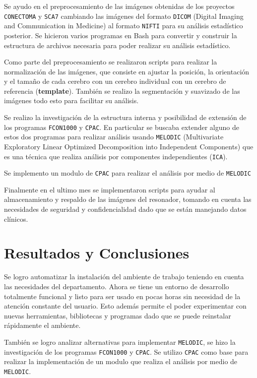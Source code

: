 \documentclass{article}
\begin{document}
Se ayudo en el preprocesamiento de las imágenes obtenidas de los proyectos \texttt{CONECTOMA} y \texttt{SCA7} cambiando las imágenes del formato \texttt{DICOM} (Digital Imaging and Communication in Medicine) al formato \texttt{NIFTI} para su análisis estadístico posterior. Se hicieron varios programas en Bash para convertir y construir la estructura de archivos necesaria para poder realizar su análisis estadístico.

Como parte del preprocesamiento se realizaron scripts para realizar la normalización de las imágenes, que consiste en ajustar la posición, la orientación y el tamaño de cada cerebro con un cerebro individual con un cerebro de referencia (\textbf{template}). También se realizo la segmentación y suavizado de las imágenes todo esto para facilitar su análisis. 

Se realizo la investigación de la estructura interna y posibilidad de extensión de los programas \texttt{FCON1000} y \texttt{CPAC}. En particular se buscaba extender alguno de estos dos programas para realizar análisis usando \texttt{MELODIC} (Multivariate Exploratory Linear Optimized Decomposition into Independent Components) que es una técnica que realiza análisis por componentes independientes (\texttt{ICA}).

Se implemento un modulo de \texttt{CPAC} para realizar el análisis por medio de \texttt{MELODIC}

Finalmente en el ultimo mes se implementaron scripts para ayudar al almacenamiento y respaldo de las imágenes del resonador, tomando en cuenta las necesidades de seguridad y confidencialidad dado que se están manejando datos clínicos.

\section{Resultados y Conclusiones}

Se logro automatizar la instalación del ambiente de trabajo teniendo en cuenta las necesidades del departamento. Ahora se tiene un entorno de desarrollo totalmente funcional y listo para ser usado en pocas horas sin necesidad de la atención constante del usuario. Esto además permite el poder experimentar con nuevas herramientas, bibliotecas y programas dado que se puede reinstalar rápidamente el ambiente.

También se logro analizar alternativas para implementar \texttt{MELODIC}, se hizo la investigación de los programas \texttt{FCON1000} y \texttt{CPAC}. Se utilizo \texttt{CPAC} como base para realizar la implementación de un modulo 
que realiza el análisis por medio de \texttt{MELODIC}.
\end{document}
